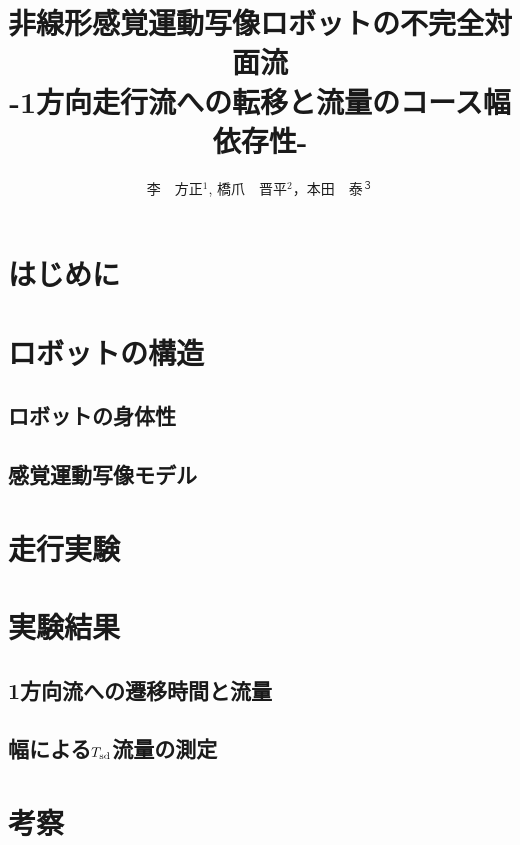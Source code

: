 \documentclass[twocolumn]{jarticle} %
\title{%
非線形感覚運動写像ロボットの不完全対面流\\
{\Large -1方向走行流への転移と流量のコース幅依存性-}
}
\author{%
李　方正$^1$, 橋爪　晋平$^2$，本田　泰$^３$
}
\affiliation{%
$^1$ 室蘭工業大学大学院　工学研究科　情報電子工学系専攻\\
$^2$ 室蘭工業大学　工学部　情報電子工学系学科\\
$^3$ 室蘭工業大学大学院　しくみ解明系領域
}
\begin{document}
\maketitle

\section{はじめに}
   
\section{ロボットの構造}
\subsection{ロボットの身体性}
   
\subsection{感覚運動写像モデル}
   
\section{走行実験}
   
\section{実験結果}
\subsection{1方向流への遷移時間と流量}
   
\subsection{幅による$T_{\rm sd}$流量の測定}
   
\section{考察}
\end{document}
